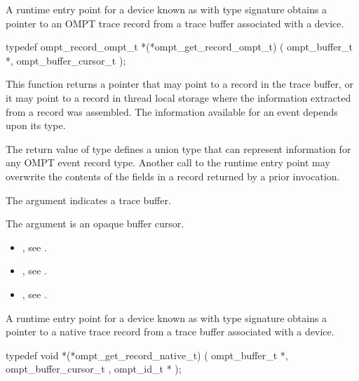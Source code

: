 \summary
A runtime entry point for a device known as 
with type signature 
obtains a pointer to an OMPT trace record from a trace buffer associated with a device.

\format
\begin{ccppspecific}
\begin{omptInquiry}
typedef ompt_record_ompt_t *(*ompt_get_record_ompt_t) (
  ompt_buffer_t *,
  ompt_buffer_cursor_t 
);
\end{omptInquiry}
\end{ccppspecific}

\descr

This function returns a pointer that may point to a record in the
trace buffer, or it may point to a record in thread local storage
where the information extracted from a record was assembled. The
information available for an event depends upon its type.

The return value of type 
defines a union type that can represent
information for any OMPT event record type.
Another call to the runtime entry point may overwrite the
contents of the fields in a record returned by a prior invocation.

\argdesc
The argument  indicates a trace buffer.

The argument  is an opaque buffer cursor.

\crossreferences
\begin{itemize}
\item {},
see .
\item {},
see .
\item {},
see .
\end{itemize}

\label{sec:ompt_get_record_native_t}

\summary

A runtime entry point for a device known as
 with type signature
obtains a pointer to a native trace record from a trace buffer associated with a device.

\format
\begin{ccppspecific}
\begin{omptInquiry}
typedef void *(*ompt_get_record_native_t) (
  ompt_buffer_t *,
  ompt_buffer_cursor_t ,
  ompt_id_t *
);
\end{omptInquiry}
\end{ccppspecific}

